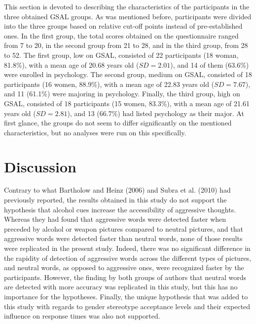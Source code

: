 \documentclass[authordate, serif, review]{jote-article}
\begin{document}
\begin{multicols}{2}
This section is devoted to describing the characteristics of the participants in the three obtained GSAL groups. As was mentioned before, participants were divided into the three groups based on relative cut-off points instead of pre-established ones. In the first group, the total scores obtained on the questionnaire ranged from 7 to 20, in the second group from 21 to 28, and in the third group, from 28 to 52. The first group, low on GSAL, consisted of 22 participants (18 woman, 81.8\%), with a mean age of 20.68 years old ($SD = 2.01$), and 14 of them (63.6\%) were enrolled in psychology. The second group, medium on GSAL, consisted of 18 participants (16 women, 88.9\%), with a mean age of 22.83 years old ($SD = 7.67$), and 11 (61.1\%) were majoring in psychology. Finally, the third group, high on GSAL, consisted of 18 participants (15 women, 83.3\%), with a mean age of 21.61 years old ($SD = 2.81$), and 13 (66.7\%) had listed psychology as their major. At first glance, the groups do not seem to differ significantly on the mentioned characteristics, but no analyses were run on this specifically.

{}
\section*{Discussion} \gotoreview
\label{sec:discussion}

\noindent Contrary to what Bartholow and Heinz (2006) and Subra et al. (2010) had previously reported, the results obtained in this study do not support the hypothesis that alcohol cues increase the accessibility of aggressive thoughts. Whereas they had found that aggressive words were detected faster when preceded by alcohol or weapon pictures compared to neutral pictures, and that aggressive words were detected faster than neutral words, none of those results were replicated in the present study. Indeed, there was no significant difference in the rapidity of detection of aggressive words across the different types of pictures, and neutral words, as opposed to aggressive ones, were recognized faster by the participants. However, the finding by both groups of authors that neutral words are detected with more accuracy was replicated in this study, but this has no importance for the hypotheses. Finally, the unique hypothesis that was added to this study with regards to gender stereotype acceptance levels and their expected influence on response times was also not supported.  


\end{multicols}
\end{document}
